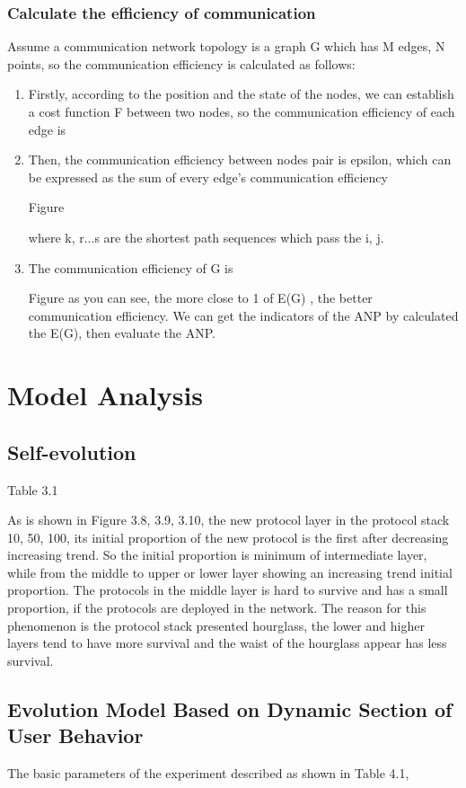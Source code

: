 \documentclass{article}
\begin{document}
\subsubsection{Calculate the efficiency of communication}
Assume a communication network topology is a graph G which has M edges, N points, so the communication efficiency is calculated as follows:
\begin{enumerate}
    \item Firstly,  according to the position and the state of the nodes, we can establish a cost function F between two nodes,  
    so the communication efficiency of each edge is
    \item Then, the communication efficiency between nodes pair is epsilon, which can be expressed as the sum of every edge's 
    communication efficiency

    Figure

    where k, r...s are the shortest path sequences which pass the i, j.
    \item The communication efficiency of G is
    
    Figure
    as you can see, the more close to 1 of E(G) , the better communication efficiency. We can get the indicators of the ANP by calculated the E(G), then evaluate the ANP.

\end{enumerate}
\section{Model Analysis}
\subsection{Self-evolution}
Table 3.1

As is shown in Figure 3.8, 3.9, 3.10, the new protocol layer in the protocol stack 10, 50, 100, its initial proportion of the new 
protocol is the first after decreasing increasing trend. So the initial proportion is minimum of intermediate layer, while from 
the middle to upper or lower layer showing an increasing trend initial proportion. The protocols in the middle layer is hard to 
survive and has a small proportion, if the protocols are deployed in the network. The reason for this phenomenon is the 
protocol stack presented hourglass, the lower and higher layers tend to have more survival and the waist of the hourglass appear has less survival.

\subsection{Evolution Model Based on Dynamic Section of User Behavior}
The basic parameters of the experiment described as shown in Table 4.1,
\end{document}
